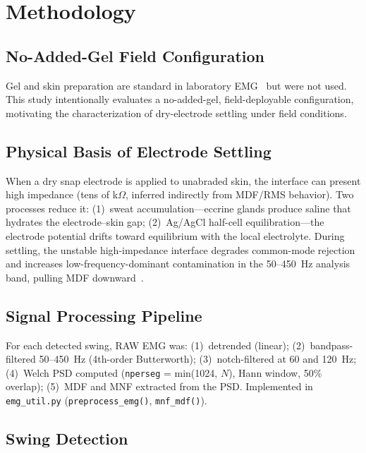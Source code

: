 \documentclass[sensors,article,submit,pdftex,moreauthors]{Definitions/mdpi}
\begin{document}
\section{Methodology}
\label{sec:methods}

\subsection{No-Added-Gel Field Configuration}

Gel and skin preparation are standard in laboratory EMG~\cite{hermens2000} but were not
used. This study intentionally evaluates a no-added-gel, field-deployable configuration,
motivating the characterization of dry-electrode settling under field conditions.

\subsection{Physical Basis of Electrode Settling}

When a dry snap electrode is applied to unabraded skin, the interface can present high
impedance (tens of k$\Omega$, inferred indirectly from MDF/RMS behavior). Two processes
reduce it: (1)~sweat accumulation---eccrine glands produce saline that hydrates the
electrode--skin gap; (2)~Ag/AgCl half-cell equilibration---the electrode potential drifts
toward equilibrium with the local electrolyte. During settling, the unstable high-impedance
interface degrades common-mode rejection and increases low-frequency-dominant
contamination in the 50--450~Hz analysis band, pulling MDF downward~\cite{joutsen2024,ravichandran2023}.

\subsection{Signal Processing Pipeline}

For each detected swing, RAW EMG was: (1)~detrended (linear); (2)~bandpass-filtered
50--450~Hz (4th-order Butterworth); (3)~notch-filtered at 60 and 120~Hz; (4)~Welch
PSD computed (\texttt{nperseg} = min(1024, $N$), Hann window, 50\% overlap); (5)~MDF
and MNF extracted from the PSD. Implemented in \texttt{emg\_util.py}
(\texttt{preprocess\_emg()}, \texttt{mnf\_mdf()}).

\subsection{Swing Detection}
\end{document}
